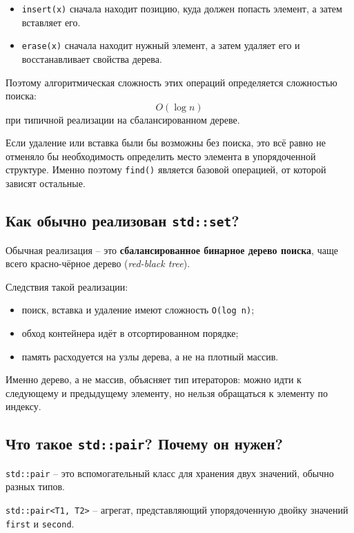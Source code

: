 \begin{itemize}
    \item \texttt{insert(x)} сначала находит позицию, куда должен попасть элемент, а затем вставляет его.
    \item \texttt{erase(x)} сначала находит нужный элемент, а затем удаляет его и восстанавливает свойства дерева.
\end{itemize}

Поэтому алгоритмическая сложность этих операций определяется сложностью поиска:
\[
O(\log n)
\]
при типичной реализации на сбалансированном дереве.

Если удаление или вставка были бы возможны без поиска, это всё равно не отменяло бы необходимость определить место элемента в упорядоченной структуре. Именно поэтому \texttt{find()} является базовой операцией, от которой зависят остальные.

\subsection{Как обычно реализован \texttt{std::set}?}
Обычная реализация -- это \textbf{сбалансированное бинарное дерево поиска}, чаще всего красно-чёрное дерево (\textit{red-black tree}).

Следствия такой реализации:
\begin{itemize}
    \item поиск, вставка и удаление имеют сложность \texttt{O(log n)};
    \item обход контейнера идёт в отсортированном порядке;
    \item память расходуется на узлы дерева, а не на плотный массив.
\end{itemize}

\begin{remark}
Именно дерево, а не массив, объясняет тип итераторов: можно идти к следующему и предыдущему элементу, но нельзя обращаться к элементу по индексу.
\end{remark}

\subsection{Что такое \texttt{std::pair}? Почему он нужен?}
\texttt{std::pair} -- это вспомогательный класс для хранения двух значений, обычно разных типов.

\begin{definition}
\texttt{std::pair<T1, T2>} -- агрегат, представляющий упорядоченную двойку значений \texttt{first} и \texttt{second}.
\end{definition}

